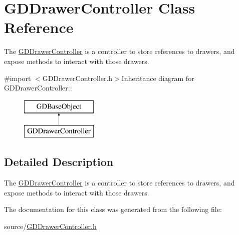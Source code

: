 \hypertarget{interface_g_d_drawer_controller}{
\section{GDDrawerController Class Reference}
\label{interface_g_d_drawer_controller}
}


The \hyperlink{interface_g_d_drawer_controller}{GDDrawerController} is a controller to store references to drawers, and expose methods to interact with those drawers.  


{\ttfamily \#import $<$GDDrawerController.h$>$}Inheritance diagram for GDDrawerController::\begin{figure}[H]
\begin{center}
\leavevmode
\includegraphics[height=2cm]{interface_g_d_drawer_controller}
\end{center}
\end{figure}


\subsection{Detailed Description}
The \hyperlink{interface_g_d_drawer_controller}{GDDrawerController} is a controller to store references to drawers, and expose methods to interact with those drawers. 

The documentation for this class was generated from the following file:\begin{DoxyCompactItemize}
\item 
source/\hyperlink{_g_d_drawer_controller_8h}{GDDrawerController.h}\end{DoxyCompactItemize}
